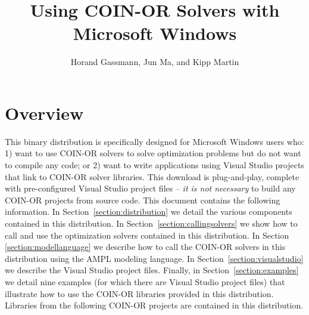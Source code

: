\documentclass[11pt]{article}
\renewcommand{\_}{{\char"5F}}
\renewcommand{\{}{{\char"7B}}
\renewcommand{\}}{{\char"7D}}
\renewcommand{\^}{{\char"0D}}
\renewcommand{\'}{{\char"0D}}
\begin{document}
\title{Using COIN-OR Solvers with Microsoft Windows}
\vskip 2in
\author{Horand Gassmann, Jun Ma,  and  Kipp Martin}
\maketitle

\iffalse
\begin{abstract}
This document describes a special binary distribution of executables, libraries and code connected 
to the COIN-OR Optimization Services (OS) project. It is intended for users of Microsoft Windows who
want to use COIN-OR solvers to solve optimization problems without the need to compile any code or 
want to write applications using Visual Studio projects that link to COIN-OR solver libraries.  
We detail the use of these binaries with several examples and give code snippets for further insight. 
We also explain how the examples can be built in Microsoft Visual Studio 
using {\tt .vcproj} files that are provided as part of the distribution.

\end{abstract}

\newpage
\fi

\section{Overview}\label{section:overview}
This binary distribution is specifically designed for Microsoft Windows users who: 
1) want to use COIN-OR solvers to solve optimization problems but do not want to compile any code; 
or 2) want to write applications using Visual Studio projects that link to COIN-OR solver libraries.  
This download is plug-and-play, complete with pre-configured Visual Studio project 
files -- {\it it is not necessary} to build any COIN-OR projects from source code.  
This document contains the following information. In Section~\ref{section:distribution} we
detail the various components contained in this distribution. In Section~\ref{section:callingsolvers}  
we show how to call and use the optimization solvers contained in this distribution.  
In Section \ref{section:modellanguage} we describe how to call the COIN-OR solvers 
in this distribution using the AMPL modeling language. In Section~\ref{section:visualstudio} 
we describe the Visual Studio project files.  Finally, in Section~\ref{section:examples} 
we detail nine examples (for which there are Visual Studio project files) that illustrate 
how to use the COIN-OR libraries provided in this distribution.  Libraries from the following 
COIN-OR projects are contained in this distribution.
\end{document}
